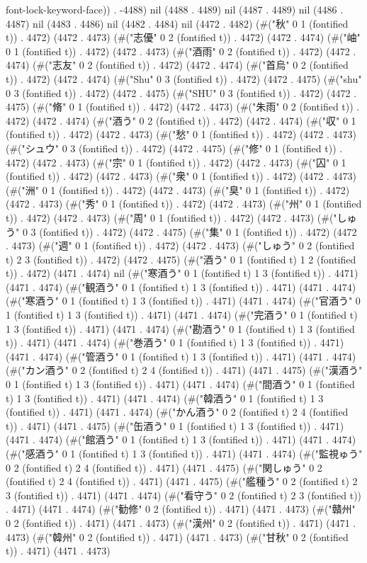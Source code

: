 {font-lock-keyword-face)) . -4488) nil (4488 . 4489) nil (4487 . 4489) nil (4486 . 4487) nil (4483 . 4486) nil (4482 . 4484) nil (4472 . 4482) (#("秋" 0 1 (fontified t)) . 4472) (4472 . 4473) (#("志優" 0 2 (fontified t)) . 4472) (4472 . 4474) (#("岫" 0 1 (fontified t)) . 4472) (4472 . 4473) (#("酒雨" 0 2 (fontified t)) . 4472) (4472 . 4474) (#("志友" 0 2 (fontified t)) . 4472) (4472 . 4474) (#("首烏" 0 2 (fontified t)) . 4472) (4472 . 4474) (#("Shu" 0 3 (fontified t)) . 4472) (4472 . 4475) (#("shu" 0 3 (fontified t)) . 4472) (4472 . 4475) (#("SHU" 0 3 (fontified t)) . 4472) (4472 . 4475) (#("脩" 0 1 (fontified t)) . 4472) (4472 . 4473) (#("朱雨" 0 2 (fontified t)) . 4472) (4472 . 4474) (#("酒う" 0 2 (fontified t)) . 4472) (4472 . 4474) (#("収" 0 1 (fontified t)) . 4472) (4472 . 4473) (#("愁" 0 1 (fontified t)) . 4472) (4472 . 4473) (#("シュウ" 0 3 (fontified t)) . 4472) (4472 . 4475) (#("修" 0 1 (fontified t)) . 4472) (4472 . 4473) (#("宗" 0 1 (fontified t)) . 4472) (4472 . 4473) (#("囚" 0 1 (fontified t)) . 4472) (4472 . 4473) (#("衆" 0 1 (fontified t)) . 4472) (4472 . 4473) (#("洲" 0 1 (fontified t)) . 4472) (4472 . 4473) (#("臭" 0 1 (fontified t)) . 4472) (4472 . 4473) (#("秀" 0 1 (fontified t)) . 4472) (4472 . 4473) (#("州" 0 1 (fontified t)) . 4472) (4472 . 4473) (#("周" 0 1 (fontified t)) . 4472) (4472 . 4473) (#("しゅう" 0 3 (fontified t)) . 4472) (4472 . 4475) (#("集" 0 1 (fontified t)) . 4472) (4472 . 4473) (#("週" 0 1 (fontified t)) . 4472) (4472 . 4473) (#("しゅう" 0 2 (fontified t) 2 3 (fontified t)) . 4472) (4472 . 4475) (#("酒う" 0 1 (fontified t) 1 2 (fontified t)) . 4472) (4471 . 4474) nil (#("寒酒う" 0 1 (fontified t) 1 3 (fontified t)) . 4471) (4471 . 4474) (#("観酒う" 0 1 (fontified t) 1 3 (fontified t)) . 4471) (4471 . 4474) (#("寒酒う" 0 1 (fontified t) 1 3 (fontified t)) . 4471) (4471 . 4474) (#("官酒う" 0 1 (fontified t) 1 3 (fontified t)) . 4471) (4471 . 4474) (#("完酒う" 0 1 (fontified t) 1 3 (fontified t)) . 4471) (4471 . 4474) (#("勘酒う" 0 1 (fontified t) 1 3 (fontified t)) . 4471) (4471 . 4474) (#("巻酒う" 0 1 (fontified t) 1 3 (fontified t)) . 4471) (4471 . 4474) (#("管酒う" 0 1 (fontified t) 1 3 (fontified t)) . 4471) (4471 . 4474) (#("カン酒う" 0 2 (fontified t) 2 4 (fontified t)) . 4471) (4471 . 4475) (#("漢酒う" 0 1 (fontified t) 1 3 (fontified t)) . 4471) (4471 . 4474) (#("間酒う" 0 1 (fontified t) 1 3 (fontified t)) . 4471) (4471 . 4474) (#("韓酒う" 0 1 (fontified t) 1 3 (fontified t)) . 4471) (4471 . 4474) (#("かん酒う" 0 2 (fontified t) 2 4 (fontified t)) . 4471) (4471 . 4475) (#("缶酒う" 0 1 (fontified t) 1 3 (fontified t)) . 4471) (4471 . 4474) (#("館酒う" 0 1 (fontified t) 1 3 (fontified t)) . 4471) (4471 . 4474) (#("感酒う" 0 1 (fontified t) 1 3 (fontified t)) . 4471) (4471 . 4474) (#("監視ゅう" 0 2 (fontified t) 2 4 (fontified t)) . 4471) (4471 . 4475) (#("関しゅう" 0 2 (fontified t) 2 4 (fontified t)) . 4471) (4471 . 4475) (#("艦種う" 0 2 (fontified t) 2 3 (fontified t)) . 4471) (4471 . 4474) (#("看守う" 0 2 (fontified t) 2 3 (fontified t)) . 4471) (4471 . 4474) (#("勧修" 0 2 (fontified t)) . 4471) (4471 . 4473) (#("贛州" 0 2 (fontified t)) . 4471) (4471 . 4473) (#("漢州" 0 2 (fontified t)) . 4471) (4471 . 4473) (#("韓州" 0 2 (fontified t)) . 4471) (4471 . 4473) (#("甘秋" 0 2 (fontified t)) . 4471) (4471 . 4473) }
